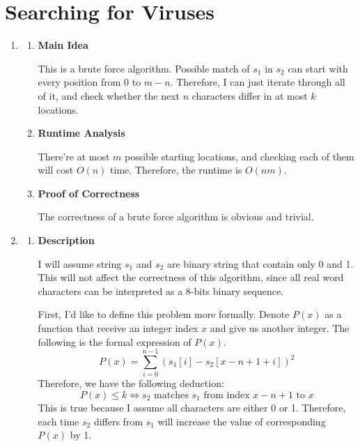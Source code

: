 \documentclass[11pt]{article}
\newenvironment{qparts}{\begin{enumerate}[{(}a{)}]}{\end{enumerate}}
\begin{document}
\newpage
\section{Searching for Viruses}

\begin{qparts}

	\item 
	\renewcommand{\theenumii}{\roman{enumii}}
	\begin{enumerate}
		\item \textbf{Main Idea}
		
		This is a brute force algorithm. Possible match of $s_1$ in $s_2$ can start with every position from $0$ to $m-n$. Therefore, I can just iterate through all of it, and check whether the next $n$ characters differ in at most $k$ locations.
		
		\item \textbf{Runtime Analysis}
		
		There're at most $m$ possible starting locations, and checking each of them will cost $O(n)$ time. Therefore, the runtime is $O(nm)$.
		
		\item \textbf{Proof of Correctness}
		
		The correctness of a brute force algorithm is obvious and trivial.
	\end{enumerate}
	
	\item 
	\renewcommand{\theenumii}{\roman{enumii}}
	\begin{enumerate}
		\item \textbf{Description}
		
		I will assume string $s_1$ and $s_2$ are binary string that contain only 0 and 1.  This will not affect the correctness of this algorithm, since all real word characters can be interpreted as a 8-bits binary sequence.
		
		First, I'd like to define this problem more formally.  Denote $P(x)$ as a function that receive an integer index $x$ and give us another integer. The following is the formal expression of $P(x)$.
		\[
			P(x) = \sum_{i=0}^{n-1} (s_1[i] - s_2[x-n+1+i])^2 
		\]		
		Therefore, we have the following deduction:
		\begin{equation}
			\label{eq:proposition}
			P(x) \leq k \iff s_2 \text{ matches } s_1 \text{ from index } x-n+1 \text{ to } x
		\end{equation}
		This is true because I assume all characters are either 0 or 1. Therefore, each time $s_2$ differs from $s_1$ will increase the value of corresponding $P(x)$ by 1.
	

\end{enumerate}
\end{qparts}
\end{document}
